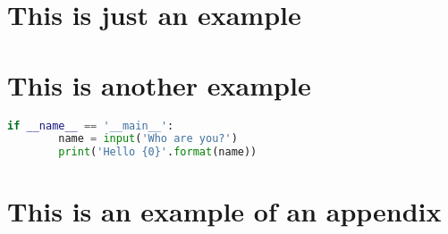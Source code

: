 \documentclass[12pt, lof, lot, lol]{ULInternshipReport}
\begin{document}
\chapter{This is just an example}
\lipsum

\chapter{This is another example}
\lipsum

\begin{lstlisting}[language=Python,%
                   label={code:dummy_example},%
                   caption={A dummy example}]
    if __name__ == '__main__':
        name = input('Who are you?')
        print('Hello {0}'.format(name))
\end{lstlisting}

\appendix

\chapter{This is an example of an appendix}
\lipsum
\end{document}
